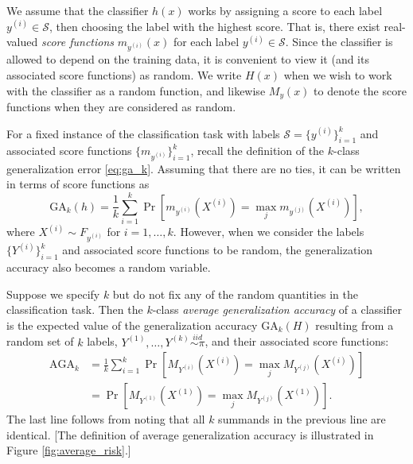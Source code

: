 \documentclass[twoside,11pt]{article}
\begin{document}
We assume that the classifier $h(x)$ works by assigning a score to each label $y^{(i)} \in \mathcal{S}$, then choosing the label with the highest score.  That is, there exist real-valued \emph{score functions} $m_{y^{(i)}}(x)$ for each label $y^{(i)} \in \mathcal{S}$.
Since the classifier is allowed to depend on the training data, it is convenient to view it (and its associated score functions) as random.  We write $H(x)$ when we wish to work with the classifier as a random function, and likewise $M_y(x)$ to denote the score functions when they are considered as random.

For a fixed instance of the classification task with labels $\mathcal{S} = \{y^{(i)}\}_{i=1}^k$ and associated score functions $\{m_{y^{(i)}}\}_{i=1}^k$, recall the definition of the $k$-class generalization error \eqref{eq:ga_k}.  Assuming that there are no ties, it can be written in terms of score functions as
\[
\text{GA}_k(h) = \frac{1}{k} \sum_{i=1}^k  \Pr[m_{y^{(i)}}(X^{(i)}) = \max_j
m_{y^{(j)}}(X^{(i)})],
\]
where $X^{(i)} \sim F_{y^{(i)}}$ for $i =1,\hdots, k$.
However, when we consider the labels $\{Y^{(i)}\}_{i=1}^k$ and associated score functions to be random, the generalization accuracy also becomes a random variable.

Suppose we specify $k$ but do not fix any of the random quantities in the
classification task.  Then the $k$-class \emph{average generalization accuracy} of
a classifier is the expected value of the generalization accuracy $\text{GA}_k(H)$ resulting from a random set of $k$ labels, $Y^{(1)}, \hdots, Y^{(k)} \stackrel{iid}{\sim \pi}$, and their associated score functions:
\begin{align*}
\text{AGA}_k &= \frac{1}{k} \sum_{i=1}^k \Pr[M_{Y^{(i)}}(X^{(i)}) = \max_j
M_{Y^{(j)}}(X^{(i)})]
\\&= \Pr[M_{Y^{(1)}}(X^{(1)}) = \max_j M_{Y^{(j)}}(X^{(1)})].
\end{align*}
The last line follows from noting that all $k$ summands in the previous line are identical.
[The definition of average generalization accuracy is illustrated in Figure \ref{fig:average_risk}.]
\end{document}
